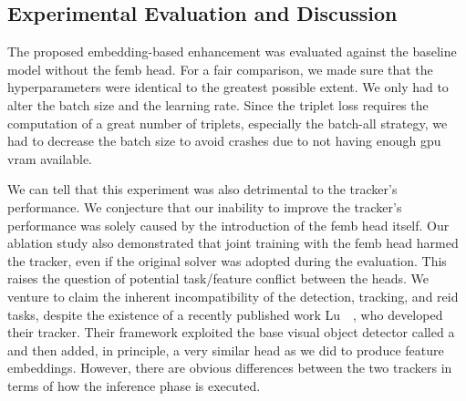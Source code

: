 \subsection{Experimental Evaluation and Discussion}

The proposed embedding-based enhancement was evaluated against the baseline model without the \gls{femb} head. For a fair comparison, we made sure that the hyperparameters were identical to the greatest possible extent. We only had to alter the batch size and the learning rate. Since the triplet loss requires the computation of a great number of triplets, especially the batch-all strategy, we had to decrease the batch size to avoid crashes due to not having enough \gls{gpu} \gls{vram} available.

We can tell that this experiment was also detrimental to the tracker's performance. We conjecture that our inability to improve the tracker's performance was solely caused by the introduction of the \gls{femb} head itself. Our ablation study also demonstrated that joint training with the \gls{femb} head harmed the tracker, even if the original solver was adopted during the evaluation. This raises the question of potential task/feature conflict between the heads. We venture to claim the inherent incompatibility of the detection, tracking, and \gls{reid} tasks, despite the existence of a recently published work Lu~\etal{}~\cite{lu2020retinatrack}, who developed their \retinatrack{} tracker. Their framework exploited the base visual object detector called a \retinanet{}~\cite{lin2018focal} and then added, in principle, a very similar head as we did to produce feature embeddings. However, there are obvious differences between the two trackers in terms of how the inference phase is executed.

